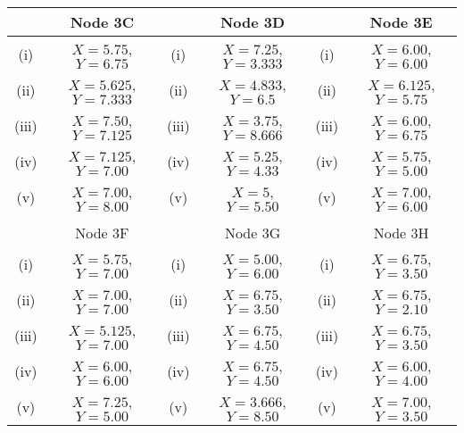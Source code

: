 \documentclass[french]{article}
\begin{document}
\newpage
			\begin{tabular}{||c|c||c|c||c|c||}
		\hline  & Node 3C &   & Node 3D &  & Node 3E  \\  \hline
	\hline (i) & $X= 5.75$, $Y= 6.75$ &  (i) & $X= 7.25$, $Y = 3.333$  & (i)  & $X= 6.00$, $Y= 6.00$\\  \hline
	\hline (ii) & $X= 5.625$, $Y= 7.333$  & (ii) & $X= 4.833$, $Y =6.5 $ &(ii) & $X= 6.125$, $Y= 5.75$ \\  \hline
	\hline (iii)  & $X= 7.50$, $Y= 7.125$  & (iii) & $X= 3.75$, $Y = 8.666$ & (iii)  & $X= 6.00$, $Y= 6.75$\\  \hline
		\hline (iv)  & $X= 7.125$, $Y = 7.00$  &  (iv) & $X= 5.25$, $Y = 4.33$ & (iv) & $X= 5.75$, $Y= 5.00$ \\  \hline
	\hline (v) & $X= 7.00$, $Y= 8.00$ & (v) & $X= 5 $, $Y= 5.50$  &(v) & $X= 7.00$, $Y= 6.00$\\  \hline & & & & & \\
	\hline 
		\hline  &  Node 3F &  & Node 3G &   & Node 3H \\  \hline
		\hline (i) & $X= 5.75$, $Y= 7.00$ & (i) & $X= 5.00$, $Y = 6.00$  & (i)  & $X= 6.75$, $Y= 3.50$\\  \hline
		\hline (ii)  & $X= 7.00$, $Y = 7.00$  & (ii) & $X= 6.75 $, $Y= 3.50$ & (ii) & $X= 6.75$, $Y = 2.10$ \\  \hline
		\hline (iii) & $X= 5.125$, $Y = 7.00 $   & (iii) & $X= 6.75$, $Y= 4.50$ &(iii) & $X= 6.75$, $Y= 3.50$ \\  \hline
		\hline (iv)  & $X= 6.00$, $Y= 6.00$  & (iv) & $X= 6.75$, $Y= 4.50$ & (iv)  & $X= 6.00 $, $Y = 4.00$\\  \hline
		\hline (v) & $X= 7.25$, $Y = 5.00$ & (v)  & $X= 3.666$, $Y = 8.50 $ & (v) & $X= 7.00$, $Y= 3.50$\\  \hline
		\hline 
		
	\end{tabular} 
\end{document}
